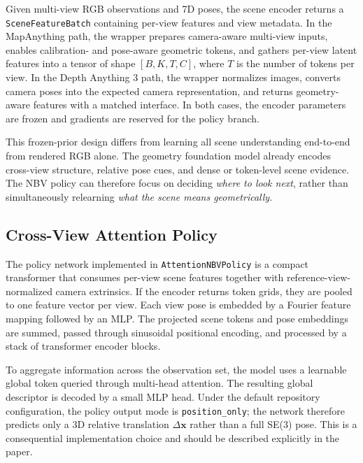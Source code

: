 Given multi-view RGB observations and 7D poses, the scene encoder returns a \texttt{SceneFeatureBatch} containing per-view features and view metadata. In the MapAnything path, the wrapper prepares camera-aware multi-view inputs, enables calibration- and pose-aware geometric tokens, and gathers per-view latent features into a tensor of shape $[B,K,T,C]$, where $T$ is the number of tokens per view. In the Depth Anything 3 path, the wrapper normalizes images, converts camera poses into the expected camera representation, and returns geometry-aware features with a matched interface. In both cases, the encoder parameters are frozen and gradients are reserved for the policy branch.

This frozen-prior design differs from learning all scene understanding end-to-end from rendered RGB alone. The geometry foundation model already encodes cross-view structure, relative pose cues, and dense or token-level scene evidence. The NBV policy can therefore focus on deciding \emph{where to look next}, rather than simultaneously relearning \emph{what the scene means geometrically}.

\subsection{Cross-View Attention Policy}
\label{sec:policy}

The policy network implemented in \texttt{AttentionNBVPolicy} is a compact transformer that consumes per-view scene features together with reference-view-normalized camera extrinsics. If the encoder returns token grids, they are pooled to one feature vector per view. Each view pose is embedded by a Fourier feature mapping followed by an MLP. The projected scene tokens and pose embeddings are summed, passed through sinusoidal positional encoding, and processed by a stack of transformer encoder blocks.

To aggregate information across the observation set, the model uses a learnable global token queried through multi-head attention. The resulting global descriptor is decoded by a small MLP head. Under the default repository configuration, the policy output mode is \texttt{position\_only}; the network therefore predicts only a 3D relative translation $\Delta \mathbf{x}$ rather than a full SE(3) pose. This is a consequential implementation choice and should be described explicitly in the paper.

